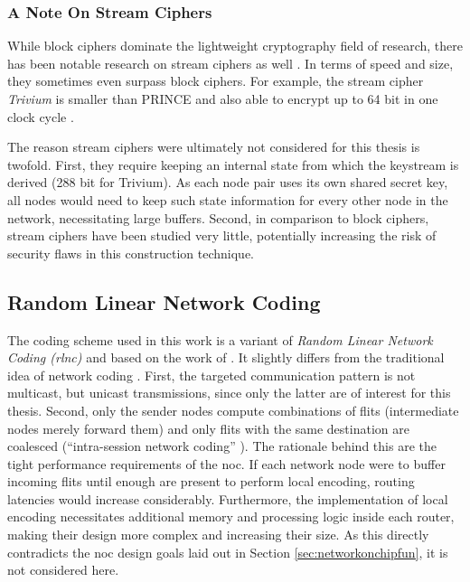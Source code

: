 \subsubsection{A Note On Stream Ciphers}
While block ciphers dominate the lightweight cryptography field of research, there has been notable research on stream ciphers as well
\cite[cf.][]{estream}. In terms of speed and size, they sometimes even surpass block ciphers. For example, the stream cipher \textit{Trivium}
\cite{decanniere06trivium} is smaller than PRINCE and also able to encrypt up to 64 bit in one clock cycle \cite[8]{harttung17lightweightcrypto}.

The reason stream ciphers were ultimately not considered for this thesis is twofold. First, they require keeping an internal state from which the
keystream is derived (288 bit for Trivium). As each node pair uses its own shared secret key, all nodes would need to keep such state information for
every other node in the network, necessitating large buffers. Second, in comparison to block ciphers, stream ciphers have been studied very little,
potentially increasing the risk of security flaws in this construction technique.

\subsection{Random Linear Network Coding}\label{sec:designnc}
The coding scheme used in this work is a variant of \textit{Random Linear Network Coding (\gls{rlnc})} and based on the work of
\citeauthor{moriam15manycorenc} \cite{moriam15manycorenc}. It slightly differs from the traditional idea of network coding
\cites{ahlswede00networkflow}{li03linearnc}. First, the targeted communication pattern is not multicast, but unicast transmissions, since only the
latter are of interest for this thesis. Second, only the sender nodes compute combinations of flits (intermediate nodes merely forward them) and only
flits with the same destination are coalesced (\enquote{intra-session network coding} \cite[1]{moriam15manycorenc}). The rationale behind this are the
tight performance requirements of the \gls{noc}. If each network node were to buffer incoming flits until enough are present to perform local
encoding, routing latencies would increase considerably. Furthermore, the implementation of local encoding necessitates additional memory and
processing logic inside each router, making their design more complex and increasing their size. As this directly contradicts the \gls{noc} design goals
laid out in Section \ref{sec:networkonchipfun}, it is not considered here.

